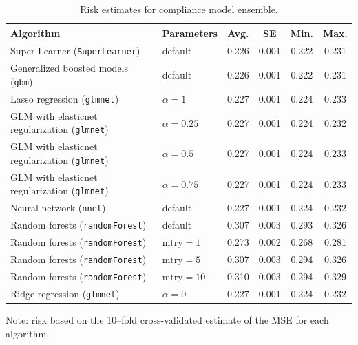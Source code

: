 \documentclass[12pt]{article}
\begin{document}
\begin{appendices}
\begin{table}[htbp]
\begin{center}
\caption{Risk estimates for compliance model ensemble.} 
\label{compliance-ensemble}
\begin{tabular}{llcccc}
  \hline
 Algorithm & Parameters & Avg. & SE & Min. & Max. \\ 
  \hline
        \rowcolor{Gray}
Super Learner (\texttt{SuperLearner}) & default & 0.226 & 0.001 & 0.222 & 0.231 \\
Generalized boosted models (\texttt{gbm}) & default & 0.226 & 0.001 & 0.222 &  0.231 \\ 
Lasso regression (\texttt{glmnet})  & $\alpha=1$ & 0.227 & 0.001 & 0.224 & 0.233 \\ 
GLM with elasticnet regularization (\texttt{glmnet}) &  $\alpha=0.25$ & 0.227 & 0.001 & 0.224 & 0.232 \\ 
GLM with elasticnet regularization (\texttt{glmnet}) &  $\alpha=0.5$ & 0.227 & 0.001 & 0.224 & 0.233 \\ 
GLM with elasticnet regularization (\texttt{glmnet}) &  $\alpha=0.75$ & 0.227 & 0.001 & 0.224 & 0.233 \\ 
Neural network (\texttt{nnet}) &  default & 0.227 & 0.001 & 0.224 & 0.232 \\ 
Random forests (\texttt{randomForest}) & default & 0.307 & 0.003 & 0.293 & 0.326  \\  
Random forests (\texttt{randomForest})  & $\mathrm{mtry}=1$ & 0.273 & 0.002 & 0.268 & 0.281 \\ 
Random forests (\texttt{randomForest})  & $\mathrm{mtry}=5$  & 0.307 & 0.003 & 0.294 & 0.326 \\  
Random forests (\texttt{randomForest})  & $\mathrm{mtry}=10$ & 0.310 & 0.003 & 0.294 & 0.329 \\ 
Ridge regression (\texttt{glmnet}) &  $\alpha=0$ & 0.227 & 0.001 & 0.224 & 0.232 \\ 
   \hline
\end{tabular} 
\end{center}
\footnotesize{Note: risk based on the 10--fold cross-validated estimate of the MSE for each algorithm.}
\end{table}
%
%

\end{appendices}
\end{document}
